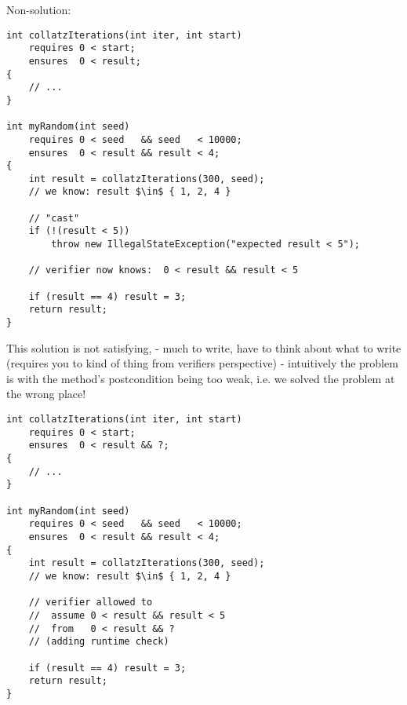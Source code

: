 Non-solution:
\begin{lstlisting}
int collatzIterations(int iter, int start)
    requires 0 < start;
    ensures  0 < result;
{
    // ...
}

int myRandom(int seed)
    requires 0 < seed   && seed   < 10000;
    ensures  0 < result && result < 4;
{
    int result = collatzIterations(300, seed);
    // we know: result $\in$ { 1, 2, 4 }
    
    // "cast"
    if (!(result < 5))
        throw new IllegalStateException("expected result < 5");

    // verifier now knows:  0 < result && result < 5 
    
    if (result == 4) result = 3;
    return result;
}
\end{lstlisting}
This solution is not satisfying, 
- much to write, have to think about what to write (requires you to kind of thing from verifiers perspective)
- intuitively the problem is with the method's postcondition being too weak, i.e. we solved the problem at the wrong place!


\begin{lstlisting}
int collatzIterations(int iter, int start)
    requires 0 < start;
    ensures  0 < result && ?;
{
    // ...
}

int myRandom(int seed)
    requires 0 < seed   && seed   < 10000;
    ensures  0 < result && result < 4;
{
    int result = collatzIterations(300, seed);
    // we know: result $\in$ { 1, 2, 4 }
    
    // verifier allowed to
    //  assume 0 < result && result < 5
    //  from   0 < result && ?
    // (adding runtime check)
    
    if (result == 4) result = 3;
    return result;
}
\end{lstlisting}



